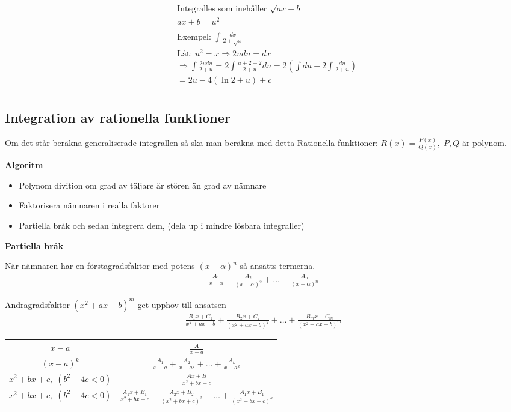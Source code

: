 \begin{multicols}{2}
\begin{align*}
  &\text{Integralles som inehåller } \sqrt{ax+b} \\ 
  &ax+b=u^2 \\
  &\\
  &\text{Exempel: } \int \frac{dx}{2+\sqrt{x}} \\
  &\text{Låt: } u^2=x \Rightarrow 2udu=dx \\
  &\Rightarrow \int\frac{2udu}{2+u} = 2\int\frac{u+2-2}{2+u}du = 2\left( \int du -2\int\frac{du}{2+u} \right) \\
  &= 2u -4(\ln{2+u}) +c \\
\end{align*}



\subsection{Integration av rationella funktioner}
Om det står beräkna generaliserade integrallen så ska man beräkna med detta
Rationella funktioner: $R(x)=\frac{P(x)}{Q(x)}, \; P,Q$ är polynom.

\textbf{Algoritm}
\begin{itemize}
  \item Polynom divition om grad av täljare är stören än grad av nämnare
  \item Faktorisera nämnaren i realla faktorer
  \item Partiella bråk och sedan integrera dem, (dela up i mindre lösbara integraller)
\end{itemize}

\textbf{Partiella bråk}

När nämnaren har en förstagradsfaktor med potens $(x-\alpha)^{n}$ så ansätts termerna.
\begin{align*}
  \frac{A_1}{x-\alpha} + \frac{A_2}{(x-\alpha)^2} + \ldots + \frac{A_n}{(x-\alpha)^n}
\end{align*}

Andragradsfaktor $(x^2+ax+b)^m$ get upphov till ansatsen
\begin{align*}
  \frac{B_1x+C_1}{x^2+ax+b} + \frac{B_2x+C_2}{(x^2+ax+b)^2} + \ldots + \frac{B_mx+C_m}{(x^2+ax+b)^m}
\end{align*}
\end{multicols}
\raggedcolumns

 
\begin{center}
\begin{tabular}{ |c|c| } 
  \hline
  $x-a$                     & $\frac{A}{x-a}$                                                  \\
  \hline
  ${(x-a)}^k$               & $\frac{A_1}{x-a}+\frac{A_2}{{x-a}^2}+\ldots+\frac{A_k}{{x-a}^k}$  \\
  \hline
  $x^2+bx+c, \; (b^2-4c<0)$ & $\frac{Ax+B}{x^2+bx+c}$                                           \\
  \hline
 $x^2+bx+c, \; (b^2-4c<0)$ & $\frac{A_1x+B_1}{x^2+bx+c}+\frac{A_2x+B_2}{{(x^2+bx+c)}^2}+\ldots+\frac{A_1x+B_1}{{(x^2+bx+c)}^k}$  \\
 \hline
\end{tabular}
\end{center}


